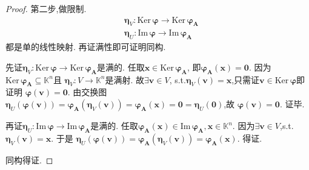 {\begin{proof}
        第二步,做限制.
        \begin{align*}
             & \bm{\eta}_V:\mathrm{Ker}\,\bm{\varphi}\longrightarrow \mathrm{Ker}\,\bm{\varphi}_{\bm{A}} \\
             & \bm{\eta}_U:\mathrm{Im}\,\bm{\varphi}\longrightarrow \mathrm{Im}\,\bm{\varphi}_{\bm{A}}
        \end{align*}
        都是单的线性映射. 再证满性即可证明同构.

        先证$\bm{\eta}_V:\mathrm{Ker}\,\bm{\varphi}\longrightarrow \mathrm{Ker}\,
            \bm{\varphi}_{\bm{A}}$是满的. 任取$\bm{x}\in \mathrm{Ker}\,\bm{\varphi}_{\bm{A}}$,
        即$\bm{\varphi}_{\bm{A}}\left(\bm{x}\right)=\bm{0}$. 因为
        $\mathrm{Ker}\,\bm{\varphi}_{\bm{A}}\subseteq \mathbb{K}^n$且
        $\bm{\eta}_V:V\longrightarrow \mathbb{K}^n$是满射. 故$\exists \bm{v}\in V$,
        s.t.$\bm{\eta}_V\left(\bm{v}\right)=\bm{x}$,只需证$\bm{v}\in \mathrm{Ker}\,\bm{\varphi}$即证明
        $\bm{\varphi}\left(\bm{v}\right)=\bm{0}$. 由交换图$\bm{\eta}_U\left(\bm{\varphi}\left(\bm{v}\right)\right)=
            \bm{\varphi}_{\bm{A}}\left(\bm{\eta}_V\left(\bm{v}\right)\right)=\bm{\varphi}_{\bm{A}}\left(\bm{x}\right)=\bm{0}=\bm{\eta}_U\left(\bm{0}\right)$,故
        $\bm{\varphi}\left(\bm{v}\right)=\bm{0}$. 证毕.

        再证$\bm{\eta}_U:\mathrm{Im}\,\bm{\varphi}\longrightarrow \mathrm{Im}\,
            \bm{\varphi}_{\bm{A}}$是满的. 任取$\bm{\varphi}_{\bm{A}}\left(\bm{x}\right)\in \mathrm{Im}\,\bm{\varphi}_{\bm{A}},\bm{x}\in \mathbb{K}^n$.
        因为$\exists \bm{v}\in V$,s.t.$\bm{\eta}_V\left(\bm{v}\right)=\bm{x}$. 于是
        $\bm{\eta}_U\left(\bm{\varphi}\left(\bm{v}\right)\right)=\bm{\varphi}_{\bm{A}}\left(\bm{\eta}_V\left(\bm{v}\right)\right)=\bm{\varphi}_{\bm{A}}\left(\bm{x}\right)$. 得证.

        同构得证.


\end{proof}}
